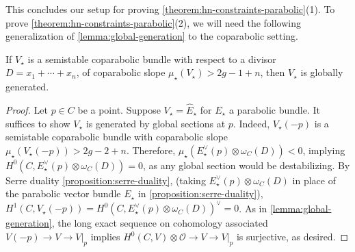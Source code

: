 This concludes our setup for proving
\autoref{theorem:hn-constraints-parabolic}(1).
To prove
\autoref{theorem:hn-constraints-parabolic}(2), we will need the following
generalization of \autoref{lemma:global-generation} to the coparabolic setting.
\begin{lemma}
\notready
	\label{lemma:coparabolic-global-generation}
	If $V_\star$ is a semistable coparabolic bundle with respect to a
	divisor $D = x_1 + \cdots + x_n$, of coparabolic slope
	$\mu_\star(V_\star) > 2g - 1 + n$, then $V_\star$ is globally
	generated.
\end{lemma}
\begin{proof}
	Let $p\in C$ be a point.
	Suppose $V_\star = \widehat{E}_\star$ for $E_\star$ a parabolic bundle.
	It suffices to show $V_\star$ is generated
	by global sections at $p$. Indeed,
	$V_\star(-p)$ is a semistable coparabolic bundle with coparabolic slope
	$\mu_\star(V_\star(-p)) > 2g-2+n$.
	Therefore, $\mu_\star(E_\star^\vee(p) \otimes \omega_C(D)) < 0$,
	implying $H^0(C, E_\star^\vee(p) \otimes \omega_C(D)) = 0$,
	as any global section would be destabilizing.
	By Serre duality \autoref{proposition:serre-duality}, (taking
		$E_\star^\vee(p) \otimes \omega_C(D)$ in place of the parabolic
	vector bundle $E_\star$ in \autoref{proposition:serre-duality}),
	$H^1(C, V_\star(-p)) = H^0(C, E_\star^\vee(p) \otimes \omega_C(D))^\vee = 0$.
	As in \autoref{lemma:global-generation},
	the long exact sequence on cohomology associated $V(-p) \to V \to V|_p$
	implies $H^0(C, V) \otimes \mathscr O \to V \to V|_p$ is surjective, as
	desired.
\end{proof}



